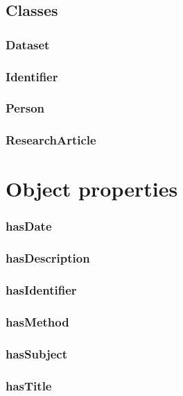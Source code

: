 \documentclass{article}
\begin{document}
\subsection*{Classes}

\subsubsection*{Dataset}

\subsubsection*{Identifier}

\subsubsection*{Person}

\subsubsection*{ResearchArticle}

\section*{Object properties}\subsubsection*{hasDate}

\subsubsection*{hasDescription}

\subsubsection*{hasIdentifier}

\subsubsection*{hasMethod}

\subsubsection*{hasSubject}

\subsubsection*{hasTitle}
\end{document}
